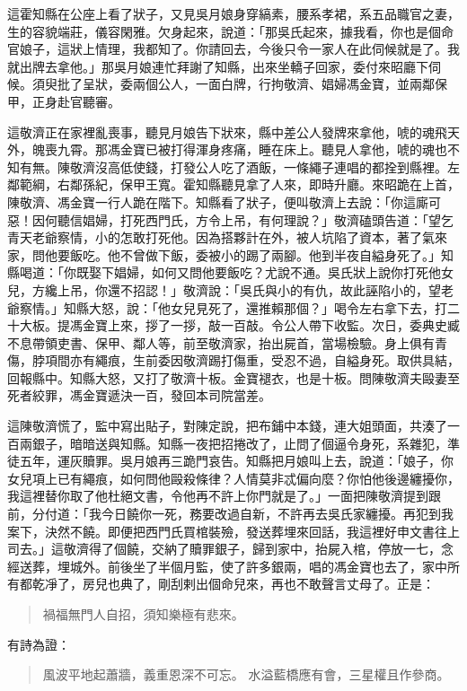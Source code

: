 這霍知縣在公座上看了狀子，又見吳月娘身穿縞素，腰系孝裙，系五品職官之妻，生的容貌端莊，儀容閑雅。欠身起來，說道：「那吳氏起來，據我看，你也是個命官娘子，這狀上情理，我都知了。你請回去，今後只令一家人在此伺候就是了。我就出牌去拿他。」那吳月娘連忙拜謝了知縣，出來坐轎子回家，委付來昭廳下伺候。須臾批了呈狀，委兩個公人，一面白牌，行拘敬濟、娼婦馮金寶，並兩鄰保甲，正身赴官聽審。

這敬濟正在家裡亂喪事，聽見月娘告下狀來，縣中差公人發牌來拿他，唬的魂飛天外，魄喪九霄。那馮金寶已被打得渾身疼痛，睡在床上。聽見人拿他，唬的魂也不知有無。陳敬濟沒高低使錢，打發公人吃了酒飯，一條繩子連唱的都拴到縣裡。左鄰範綱，右鄰孫紀，保甲王寬。霍知縣聽見拿了人來，即時升廳。來昭跪在上首，陳敬濟、馮金寶一行人跪在階下。知縣看了狀子，便叫敬濟上去說：「你這廝可惡！因何聽信娼婦，打死西門氏，方令上吊，有何理說？」敬濟磕頭告道：「望乞青天老爺察情，小的怎敢打死他。因為搭夥計在外，被人坑陷了資本，著了氣來家，問他要飯吃。他不曾做下飯，委被小的踢了兩腳。他到半夜自縊身死了。」知縣喝道：「你既娶下娼婦，如何又問他要飯吃？尤說不通。吳氏狀上說你打死他女兒，方纔上吊，你還不招認！」敬濟說：「吳氏與小的有仇，故此誣陷小的，望老爺察情。」知縣大怒，說：「他女兒見死了，還推賴那個？」喝令左右拿下去，打二十大板。提馮金寶上來，拶了一拶，敲一百敲。令公人帶下收監。次日，委典史臧不息帶領吏書、保甲、鄰人等，前至敬濟家，抬出屍首，當場檢驗。身上俱有青傷，脖項間亦有繩痕，生前委因敬濟踢打傷重，受忍不過，自縊身死。取供具結，回報縣中。知縣大怒，又打了敬濟十板。金寶褪衣，也是十板。問陳敬濟夫毆妻至死者絞罪，馮金寶遞決一百，發回本司院當差。

這陳敬濟慌了，監中寫出貼子，對陳定說，把布鋪中本錢，連大姐頭面，共湊了一百兩銀子，暗暗送與知縣。知縣一夜把招捲改了，止問了個逼令身死，系雜犯，準徒五年，運灰贖罪。吳月娘再三跪門哀告。知縣把月娘叫上去，說道：「娘子，你女兒項上已有繩痕，如何問他毆殺條律？人情莫非忒偏向麼？你怕他後邊纏擾你，我這裡替你取了他杜絕文書，令他再不許上你門就是了。」一面把陳敬濟提到跟前，分付道：「我今日饒你一死，務要改過自新，不許再去吳氏家纏擾。再犯到我案下，決然不饒。即便把西門氏買棺裝殮，發送葬埋來回話，我這裡好申文書往上司去。」這敬濟得了個饒，交納了贖罪銀子，歸到家中，抬屍入棺，停放一七，念經送葬，埋城外。前後坐了半個月監，使了許多銀兩，唱的馮金寶也去了，家中所有都乾凈了，房兒也典了，剛刮剌出個命兒來，再也不敢聲言丈母了。正是：
\begin{quote}
禍福無門人自招，須知樂極有悲來。
\end{quote}
有詩為證：
\begin{quote}
風波平地起蕭牆，義重恩深不可忘。
水溢藍橋應有會，三星權且作參商。
\end{quote}

